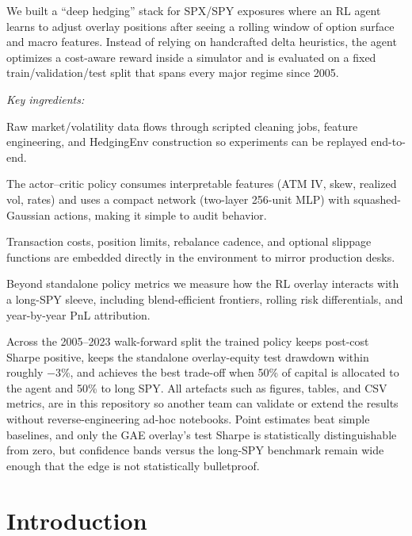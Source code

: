 \documentclass[,11pt,letterpaper,twocolumn]{article}
\begin{document}
\noindent We built a ``deep hedging'' stack for SPX/SPY exposures
where an RL agent learns to adjust overlay positions after seeing a
rolling window of option surface and macro features. Instead of relying
on handcrafted delta heuristics, the agent optimizes a cost-aware
reward inside a simulator and is evaluated on a fixed train/validation/test split that spans every major regime since 2005.

\medskip\noindent\textit{Key ingredients:}

\begin{description}[leftmargin=0pt,labelsep=0.65em,itemsep=0.25em,parsep=0pt]
\item[\textbf{Deterministic pipeline.}]
Raw market/volatility data flows through scripted cleaning jobs,
feature engineering, and HedgingEnv construction so experiments can be
replayed end-to-end.
\item[\textbf{Explainable agent.}]
The actor--critic policy consumes interpretable features (ATM IV, skew,
realized vol, rates) and uses a compact network (two-layer 256-unit MLP) with
squashed-Gaussian actions, making it simple to audit behavior.
\item[\textbf{Realistic execution.}]
Transaction costs, position limits, rebalance cadence, and optional
slippage functions are embedded directly in the environment to mirror
production desks.
\item[\textbf{Overlay diagnostics.}]
Beyond standalone policy metrics we measure how the RL overlay
interacts with a long-SPY sleeve, including blend-efficient frontiers,
rolling risk differentials, and year-by-year PnL attribution.
\end{description}

\medskip
Across the 2005--2023 walk-forward split the trained policy keeps
post-cost Sharpe positive, keeps the standalone overlay-equity test
drawdown within roughly −3\%, and achieves the best trade-off when 50\%
of capital is allocated to the agent and 50\% to long SPY. All artefacts such as figures, tables, and CSV
metrics, are in this repository so another team can validate or extend
the results without reverse-engineering ad-hoc notebooks. Point
estimates beat simple baselines, and only the GAE overlay's test Sharpe
is statistically distinguishable from zero, but confidence bands versus
the long-SPY benchmark remain wide enough that the edge is not
statistically bulletproof.

\section{Introduction}\label{introduction}
\end{document}
